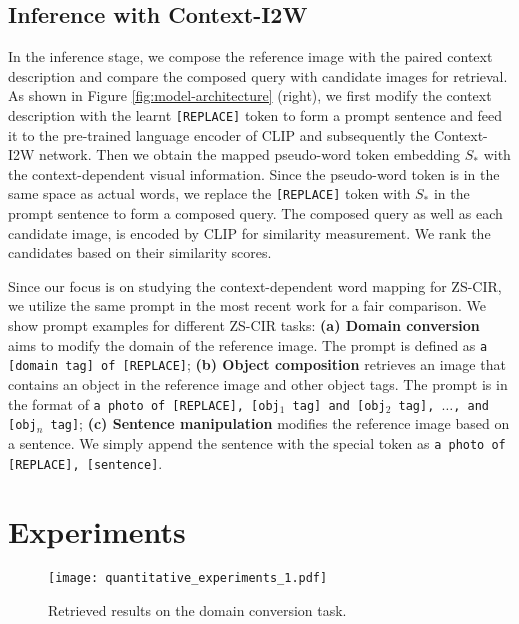 \documentclass[letterpaper]{article} \usepackage{aaai24}  \usepackage{times}  \usepackage{helvet}  \usepackage{courier}  \usepackage[hyphens]{url}  \usepackage{graphicx} \urlstyle{rm} \def\UrlFont{\rm}  \usepackage{natbib}  \usepackage{caption} \frenchspacing  \setlength{\pdfpagewidth}{8.5in} \setlength{\pdfpageheight}{11in} \usepackage{algorithm}
\begin{document}
\subsection{Inference with Context-I2W}
\label{sec:inference}


In the inference stage, we compose the reference image with the paired context description and compare the composed query with candidate images for retrieval. As shown in Figure \ref{fig:model-architecture} (right), we first modify the context description with the learnt  \texttt{[REPLACE]} token to form a prompt sentence and feed it to the pre-trained language encoder of CLIP and subsequently the Context-I2W network. Then we obtain the mapped pseudo-word token embedding $S_*$ with the context-dependent visual information. Since the pseudo-word token is in the same space as actual words, we replace the \texttt{[REPLACE]} token with $S_*$ in the prompt sentence to form a composed query. The composed query as well as each candidate image, is encoded by CLIP for similarity measurement. We rank the candidates based on their similarity scores. 

Since our focus is on studying the context-dependent word mapping for ZS-CIR, we utilize the same prompt in the most recent work \cite{Saito_2023_CVPR} for a fair comparison. We show prompt examples for different ZS-CIR tasks: \textbf{(a) Domain conversion} aims to modify the domain of the reference image. 
The  prompt is defined as \texttt{a [domain tag] of [REPLACE]}; 
\textbf{(b) Object composition} retrieves an image that contains an object in the reference image and other object tags. The prompt is in the format of \texttt{a photo of [REPLACE], [obj$_1$ tag] and [obj$_2$ tag], $\dots$, and [obj$_n$ tag]}; 
\textbf{(c) Sentence manipulation} modifies the reference image based on a sentence. We simply append the sentence with the special token as  \texttt{a photo of [REPLACE], [sentence]}.

\section{Experiments}

\begin{figure}[t]
    \centering
\centering
    \texttt{[image: quantitative\_experiments\_1.pdf]}
    \caption{Retrieved results on the domain conversion task.}
    \vspace{-10pt}
    \label{fig:imgnet}
\end{figure}
\end{document}
